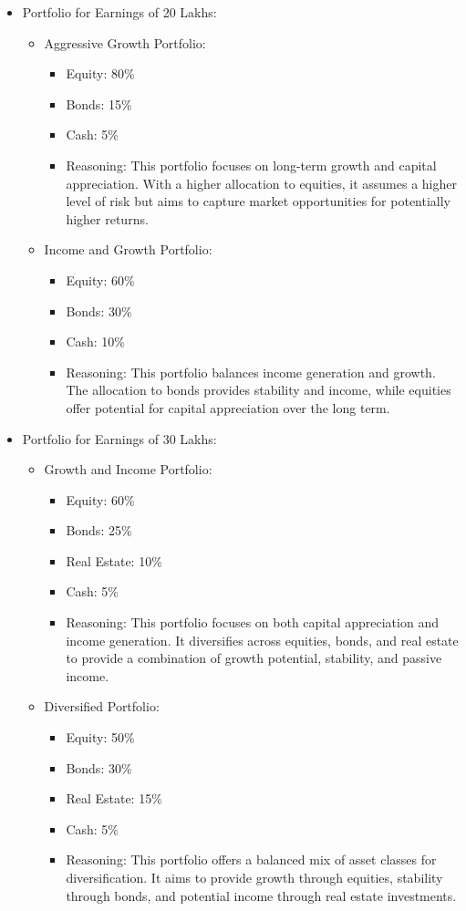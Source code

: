 \begin{itemize}
  \item Portfolio for Earnings of 20 Lakhs:
  \begin{itemize}
    \item Aggressive Growth Portfolio:
    \begin{itemize}
      \item Equity: 80\%
      \item Bonds: 15\%
      \item Cash: 5\%
      \item Reasoning: This portfolio focuses on long-term growth and capital appreciation. With a higher allocation to equities, it assumes a higher level of risk but aims to capture market opportunities for potentially higher returns.
    \end{itemize}
    \item Income and Growth Portfolio:
    \begin{itemize}
      \item Equity: 60\%
      \item Bonds: 30\%
      \item Cash: 10\%
      \item Reasoning: This portfolio balances income generation and growth. The allocation to bonds provides stability and income, while equities offer potential for capital appreciation over the long term.
    \end{itemize}
  \end{itemize}
  
  \item Portfolio for Earnings of 30 Lakhs:
  \begin{itemize}
    \item Growth and Income Portfolio:
    \begin{itemize}
      \item Equity: 60\%
      \item Bonds: 25\%
      \item Real Estate: 10\%
      \item Cash: 5\%
      \item Reasoning: This portfolio focuses on both capital appreciation and income generation. It diversifies across equities, bonds, and real estate to provide a combination of growth potential, stability, and passive income.
    \end{itemize}
    \item Diversified Portfolio:
    \begin{itemize}
      \item Equity: 50\%
      \item Bonds: 30\%
      \item Real Estate: 15\%
      \item Cash: 5\%
      \item Reasoning: This portfolio offers a balanced mix of asset classes for diversification. It aims to provide growth through equities, stability through bonds, and potential income through real estate investments.
    \end{itemize}
  \end{itemize}
  

\end{itemize}
